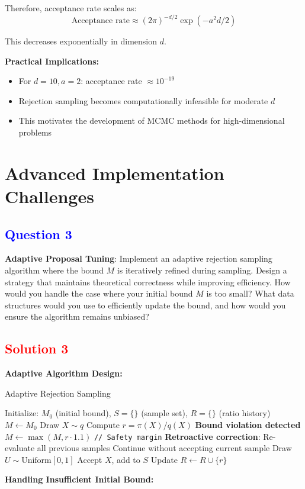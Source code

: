 \documentclass[11pt]{article}
\newcommand{\question}[1]{\subsection*{\textcolor{blue}{Question #1}}}
\newcommand{\solution}[1]{\subsection*{\textcolor{red}{Solution #1}}}
\begin{document}
Therefore, acceptance rate scales as:
$$\text{Acceptance rate} \approx (2\pi)^{-d/2}\exp(-a^2d/2)$$

This decreases exponentially in dimension $d$.

\textbf{Practical Implications:}
\begin{itemize}
\item For $d=10, a=2$: acceptance rate $\approx 10^{-19}$
\item Rejection sampling becomes computationally infeasible for moderate $d$
\item This motivates the development of MCMC methods for high-dimensional problems
\end{itemize}

\section{Advanced Implementation Challenges}

\question{3}
\textbf{Adaptive Proposal Tuning}: Implement an adaptive rejection sampling algorithm where the bound $M$ is iteratively refined during sampling. Design a strategy that maintains theoretical correctness while improving efficiency. How would you handle the case where your initial bound $M$ is too small? What data structures would you use to efficiently update the bound, and how would you ensure the algorithm remains unbiased?

\solution{3}
\textbf{Adaptive Algorithm Design:}

\begin{algorithm}
\caption{Adaptive Rejection Sampling}
\begin{algorithmic}[1]
\STATE Initialize: $M_0$ (initial bound), $S = \{\}$ (sample set), $R = \{\}$ (ratio history)
\STATE $M \gets M_0$
    \STATE Draw $X \sim q$
    \STATE Compute $r = \pi(X)/q(X)$
        \STATE \textbf{Bound violation detected}
        \STATE $M \gets \max(M, r \cdot 1.1)$ \texttt{// Safety margin}
        \STATE \textbf{Retroactive correction}: Re-evaluate all previous samples
        \STATE Continue without accepting current sample
    \ELSE
        \STATE Draw $U \sim \text{Uniform}[0,1]$
            \STATE Accept $X$, add to $S$
        \ENDIF
    \ENDIF
    \STATE Update $R \gets R \cup \{r\}$
\ENDWHILE
\end{algorithmic}
\end{algorithm}

\textbf{Handling Insufficient Initial Bound:}
\end{document}
